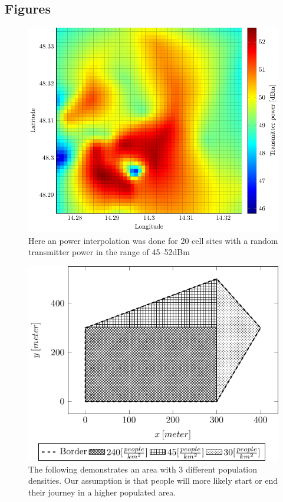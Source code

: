\documentclass[twocolumn]{bmcart}%
\begin{document}
\begin{backmatter}
	
	\section*{Figures}
	 
	
	\begin{figure}[h!]
		\label{fig:transmitpower}
		\caption{
		Here an power interpolation was done for 20 cell sites with a random transmitter power in the range of 45--52dBm}
		\includegraphics{senderpower}
	\end{figure}
	\begin{figure}[h!]
		\label{fig:populationgrid}
		\caption{ The following demonstrates an area with 3 different population densities. Our assumption is that people will more likely start or end their journey in a higher populated area.
		}
		\includegraphics{populationgrid}

\end{figure}
\end{backmatter}
\end{document}
